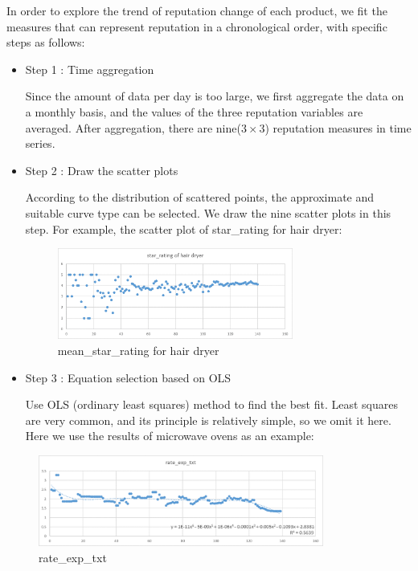 \documentclass{mcmthesis}
\begin{document}
In order to explore the trend of reputation change of each product, we fit the measures that can represent reputation in a chronological order, with specific steps as follows:

\begin{itemize}
\item  Step 1 : Time aggregation

\quad \quad Since the amount of data per day is too large, we first aggregate the data on a monthly basis, and the values of the three reputation variables are averaged. After aggregation, there are nine($3 \times 3$) reputation measures in time series.

\item  Step 2 : Draw the scatter plots

\quad \quad According to the distribution of scattered points, the approximate and suitable curve type can be selected. We draw the nine scatter plots in this step. For example, the scatter plot of star\_rating for hair dryer:

\begin{figure}[H]
\centering
\includegraphics[width=.85\textwidth,height=3cm]{figures/a.png}
\caption{mean\_star\_rating for hair dryer}
\end{figure}

\item  Step 3 : Equation selection based on OLS

\quad \quad Use OLS (ordinary least squares) method to find the best fit. Least squares are very common, and its principle is relatively simple, so we omit it here. Here we use the results of microwave ovens as an example:
\end{itemize}

\begin{figure}[H]
\centering
\includegraphics[width=.85\textwidth,height=3cm]{figures/b.png}
\caption{rate\_exp\_txt }
\end{figure}
\end{document}
